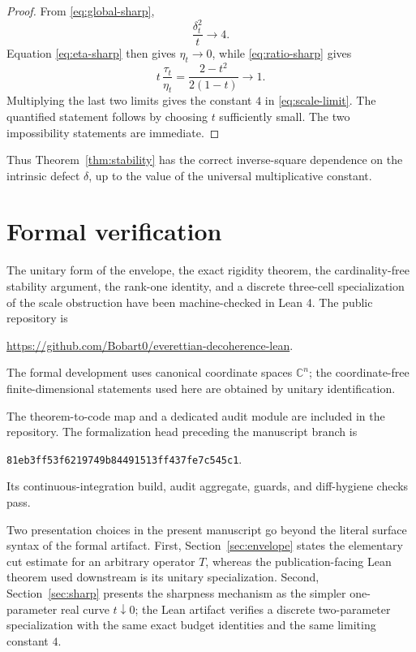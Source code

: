 \documentclass[11pt]{article}
\newcommand{\C}{\mathbb{C}}
\newcommand{\dd}{\delta}
\begin{document}
\begin{proof}
From \eqref{eq:global-sharp},
\[
  \frac{\dd_t^2}{t}\longrightarrow4.
\]
Equation \eqref{eq:eta-sharp} then gives $\eta_t\to0$, while
\eqref{eq:ratio-sharp} gives
\[
  t\,\frac{\tau_t}{\eta_t}
  =
  \frac{2-t^2}{2(1-t)}
  \longrightarrow1.
\]
Multiplying the last two limits gives the constant $4$ in
\eqref{eq:scale-limit}.  The quantified statement follows by choosing $t$
sufficiently small.  The two impossibility statements are immediate.
\end{proof}

Thus Theorem~\ref{thm:stability} has the correct inverse-square dependence
on the intrinsic defect $\dd$, up to the value of the universal
multiplicative constant.

\section{Formal verification}\label{sec:formal}

The unitary form of the envelope, the exact rigidity theorem, the
cardinality-free stability argument, the rank-one identity, and a discrete
three-cell specialization of the scale obstruction have been machine-checked
in Lean 4.  The public repository is
\begin{center}
\url{https://github.com/Bobart0/everettian-decoherence-lean}.
\end{center}
The formal development uses canonical coordinate spaces $\C^n$; the
coordinate-free finite-dimensional statements used here are obtained by
unitary identification.

The theorem-to-code map and a dedicated audit module are included in the
repository.  The formalization head preceding the manuscript branch is
\begin{center}
\small\texttt{81eb3ff53f6219749b84491513ff437fe7c545c1}.
\end{center}
Its continuous-integration build, audit aggregate, guards, and
diff-hygiene checks pass.

Two presentation choices in the present manuscript go beyond the literal
surface syntax of the formal artifact.  First, Section~\ref{sec:envelope}
states the elementary cut estimate for an arbitrary operator $T$, whereas
the publication-facing Lean theorem used downstream is its unitary
specialization.  Second, Section~\ref{sec:sharp} presents the sharpness
mechanism as the simpler one-parameter real curve $t\downarrow0$; the Lean
artifact verifies a discrete two-parameter specialization with the same
exact budget identities and the same limiting constant $4$.
\end{document}
